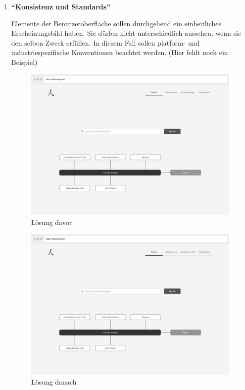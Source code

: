 \begin{enumerate}
\clearpage


\item \textbf{\enquote{Konsistenz und Standards}} \newline

Elemente der Benutzeroberfläche sollen durchgehend ein einheitliches Erscheinungsbild haben.
Sie dürfen nicht unterschiedlich aussehen, wenn sie den selben Zweck erfüllen.
In diesem Fall sollen platform- und industriespezifische Konventionen beachtet werden.
(Hier fehlt noch ein Beispiel)

\begin{figure}[H]
	\centering
    	\includegraphics[width=1.45\textwidth, angle=-90]{Images/Startseite}
   	\caption{Lösung davor}
\end{figure}

\begin{figure}[H]
	\centering
    	\includegraphics[width=1.45\textwidth, angle=-90]{Images/Startseite}
   	\caption{Lösung danach}
\end{figure}


\end{enumerate}
